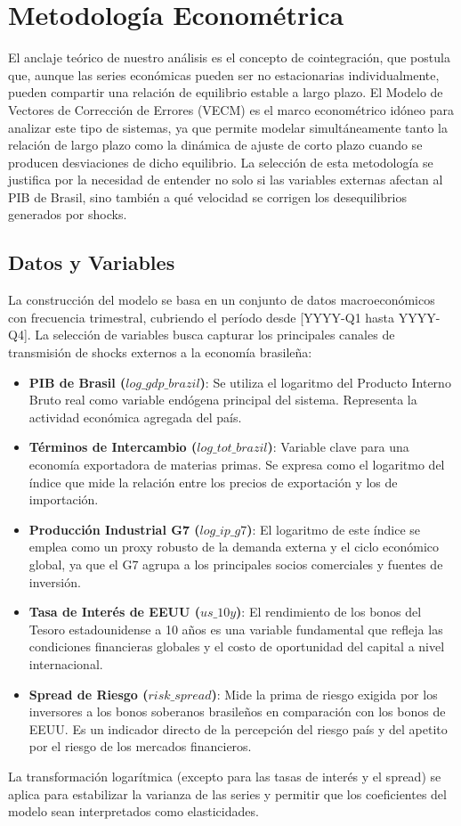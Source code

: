 \documentclass[12pt, a4paper]{article}
\begin{document}
\section{Metodología Econométrica}
El anclaje teórico de nuestro análisis es el concepto de cointegración, que postula que, aunque las series económicas pueden ser no estacionarias individualmente, pueden compartir una relación de equilibrio estable a largo plazo. El Modelo de Vectores de Corrección de Errores (VECM) es el marco econométrico idóneo para analizar este tipo de sistemas, ya que permite modelar simultáneamente tanto la relación de largo plazo como la dinámica de ajuste de corto plazo cuando se producen desviaciones de dicho equilibrio. La selección de esta metodología se justifica por la necesidad de entender no solo si las variables externas afectan al PIB de Brasil, sino también a qué velocidad se corrigen los desequilibrios generados por shocks.

\subsection{Datos y Variables}
La construcción del modelo se basa en un conjunto de datos macroeconómicos con frecuencia trimestral, cubriendo el período desde [YYYY-Q1 hasta YYYY-Q4]. La selección de variables busca capturar los principales canales de transmisión de shocks externos a la economía brasileña:
\begin{itemize}
    \item \textbf{PIB de Brasil ($log\_gdp\_brazil$)}: Se utiliza el logaritmo del Producto Interno Bruto real como variable endógena principal del sistema. Representa la actividad económica agregada del país.
    \item \textbf{Términos de Intercambio ($log\_tot\_brazil$)}: Variable clave para una economía exportadora de materias primas. Se expresa como el logaritmo del índice que mide la relación entre los precios de exportación y los de importación.
    \item \textbf{Producción Industrial G7 ($log\_ip\_g7$)}: El logaritmo de este índice se emplea como un proxy robusto de la demanda externa y el ciclo económico global, ya que el G7 agrupa a los principales socios comerciales y fuentes de inversión.
    \item \textbf{Tasa de Interés de EEUU ($us\_10y$)}: El rendimiento de los bonos del Tesoro estadounidense a 10 años es una variable fundamental que refleja las condiciones financieras globales y el costo de oportunidad del capital a nivel internacional.
    \item \textbf{Spread de Riesgo ($risk\_spread$)}: Mide la prima de riesgo exigida por los inversores a los bonos soberanos brasileños en comparación con los bonos de EEUU. Es un indicador directo de la percepción del riesgo país y del apetito por el riesgo de los mercados financieros.
\end{itemize}
La transformación logarítmica (excepto para las tasas de interés y el spread) se aplica para estabilizar la varianza de las series y permitir que los coeficientes del modelo sean interpretados como elasticidades.
\end{document}
